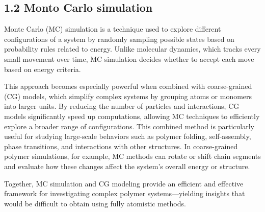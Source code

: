 \documentclass[12pt]{article}
\begin{document}
\begin{flushleft}
	
	
\vspace{-1em} 

\subsection*{1.2 Monto Carlo simulation}



Monte Carlo (MC) simulation is a technique used to explore different configurations of a system by randomly sampling possible states based on probability rules related to energy. Unlike molecular dynamics, which tracks every small movement over time, MC simulation decides whether to accept each move based on energy criteria.

This approach becomes especially powerful when combined with coarse-grained (CG) models, which simplify complex systems by grouping atoms or monomers into larger units. By reducing the number of particles and interactions, CG models significantly speed up computations, allowing MC techniques to efficiently explore a broader range of configurations. This combined method is particularly useful for studying large-scale behaviors such as polymer folding, self-assembly, phase transitions, and interactions with other structures. In coarse-grained polymer simulations, for example, MC methods can rotate or shift chain segments and evaluate how these changes affect the system’s overall energy or structure.

Together, MC simulation and CG modeling provide an efficient and effective framework for investigating complex polymer systems—yielding insights that would be difficult to obtain using fully atomistic methods.

\end{flushleft}
\end{document}
